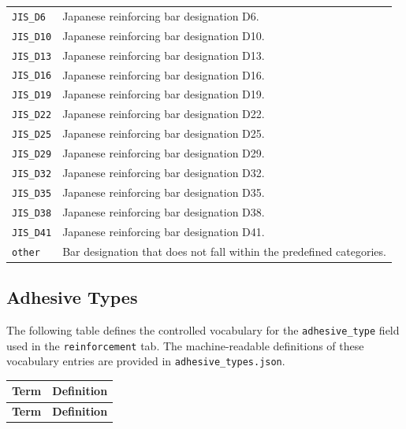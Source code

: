 \documentclass[11pt]{book}
\begin{document}
{\begin{longtable}{p{}p{}}
\texttt{JIS\_D6} & Japanese reinforcing bar designation D6. \\
\texttt{JIS\_D10} & Japanese reinforcing bar designation D10. \\
\texttt{JIS\_D13} & Japanese reinforcing bar designation D13. \\
\texttt{JIS\_D16} & Japanese reinforcing bar designation D16. \\
\texttt{JIS\_D19} & Japanese reinforcing bar designation D19. \\
\texttt{JIS\_D22} & Japanese reinforcing bar designation D22. \\
\texttt{JIS\_D25} & Japanese reinforcing bar designation D25. \\
\texttt{JIS\_D29} & Japanese reinforcing bar designation D29. \\
\texttt{JIS\_D32} & Japanese reinforcing bar designation D32. \\
\texttt{JIS\_D35} & Japanese reinforcing bar designation D35. \\
\texttt{JIS\_D38} & Japanese reinforcing bar designation D38. \\
\texttt{JIS\_D41} & Japanese reinforcing bar designation D41. \\

\hline

\texttt{other} &
Bar designation that does not fall within the predefined categories. \\

\hline
\end{longtable}

\subsection{Adhesive Types}
\label{vocab:adhesive_type_list}

The following table defines the controlled vocabulary for the \texttt{adhesive\_type} field used in the \texttt{reinforcement} tab. The machine-readable definitions of these vocabulary entries are provided in \texttt{adhesive\_types.json}.

\begin{longtable}{p{}p{}}
\hline
\textbf{Term} & \textbf{Definition} \\
\hline
\endfirsthead

\hline
\textbf{Term} & \textbf{Definition} \\
\hline
\endhead


\end{longtable}}
\end{document}
